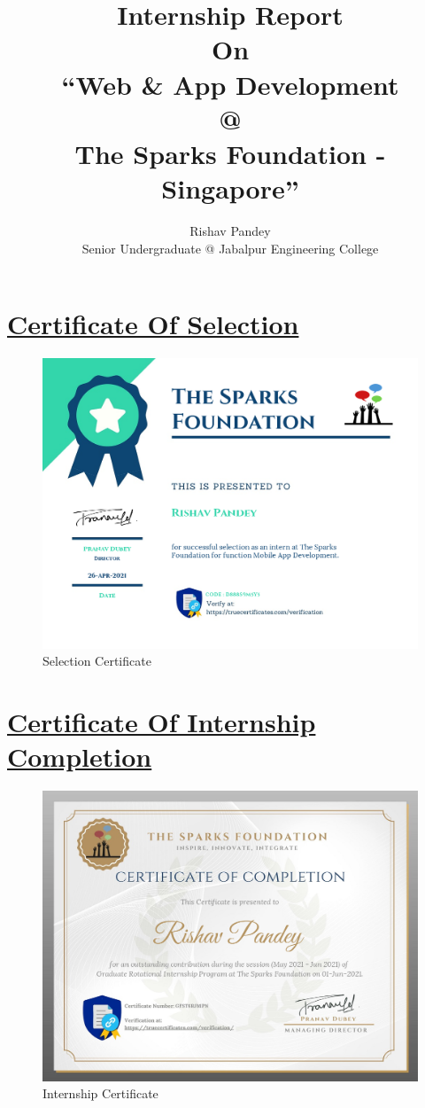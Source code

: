 \documentclass[12pt]{article}
\title{Internship Report\\On\\“Web \& App Development\\@\\The Sparks Foundation - Singapore”}
\author{Rishav Pandey\\Senior Undergraduate @ Jabalpur Engineering College}
\date{}
\begin{document}
\maketitle
\clearpage
\tableofcontents
\clearpage
\listoffigures
\clearpage

\section[Certificate Of Selection]{\underline{Certificate Of Selection}}
\begin{figure}[h]
\centering
\includegraphics[scale=0.4]{1642006136608.png}
\caption{Selection Certificate}
\end{figure}
\clearpage

\section[Certificate Of Internship Completion]{\underline{Certificate Of Internship Completion}}
\begin{figure}[h]
\centering
\includegraphics[scale=0.4]{1642006136604.png}
\caption{Internship Certificate}
\end{figure}
\clearpage
\end{document}
